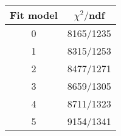 \begin{tabular}{c|c}
Fit model & $\chi^2/$ndf \\
\hline
0 & 8165/1235\\
1 & 8315/1253\\
2 & 8477/1271\\
3 & 8659/1305\\
4 & 8711/1323\\
5 & 9154/1341\\
\end{tabular}

